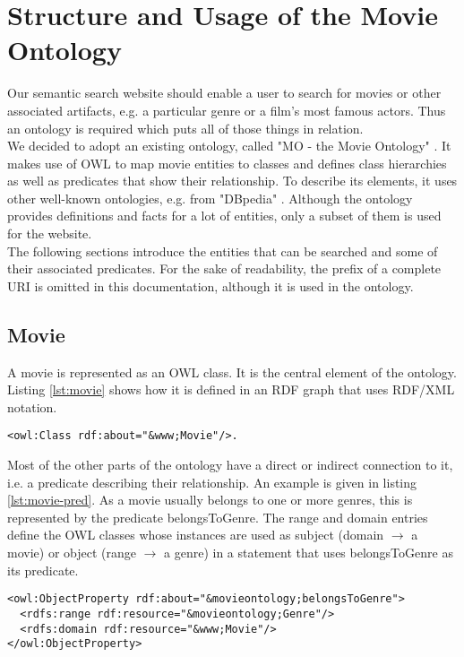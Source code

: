 \section{Structure and Usage of the Movie Ontology}
\label{sec:ontology}
Our semantic search website should enable a user to search for movies or other associated artifacts, e.g. a particular genre or a film's most famous actors. Thus an ontology is required which puts all of those things in relation. \\
We decided to adopt an existing ontology, called "MO - the Movie Ontology" \cite{bouza:movieontology}. It makes use of OWL\cite{rdf-owl} to map movie entities to classes and defines class hierarchies as well as predicates that show their relationship. To describe its elements, it uses other well-known ontologies, e.g. from "DBpedia" \cite{dbpedia-swj}. Although the ontology provides definitions and facts for a lot of entities, only a subset of them is used for the website. \\
The following sections introduce the entities that can be searched and some of their associated predicates. For the sake of readability, the prefix of a complete URI is omitted in this documentation, although it is used in the ontology.

\subsection{Movie}
A movie is represented as an OWL class. It is the central element of the ontology. Listing \ref{lst:movie} shows how it is defined in an RDF graph that uses RDF/XML notation.

\begin{lstlisting}[caption={OWL Movie Class in RDF/XML notation},label={lst:movie}]
<owl:Class rdf:about="&www;Movie"/>.
\end{lstlisting}

Most of the other parts of the ontology have a direct or indirect connection to it, i.e. a predicate describing their relationship. An example is given in listing \ref{lst:movie-pred}. As a movie usually belongs to one or more genres, this is represented by the predicate belongsToGenre. The range and domain entries define the OWL classes whose instances are used as subject (domain $\rightarrow$ a movie) or object (range $\rightarrow$ a genre) in a statement that uses belongsToGenre as its predicate.

\begin{lstlisting}[caption={Exemplary Movie predicate in RDF/XML notation},label={lst:movie-pred}]
<owl:ObjectProperty rdf:about="&movieontology;belongsToGenre">
  <rdfs:range rdf:resource="&movieontology;Genre"/>
  <rdfs:domain rdf:resource="&www;Movie"/>
</owl:ObjectProperty>
\end{lstlisting}

